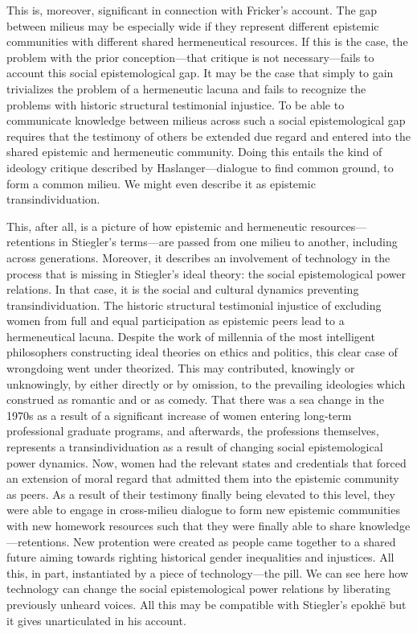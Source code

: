 \documentclass[letterpaper,notitlepage,12pt]{article}
\begin{document}
This is, moreover, significant in connection with Fricker's account.
The gap between milieus may be especially wide if they represent different
epistemic communities with different shared hermeneutical resources.
If this is the case, the problem with the prior conception---that critique is
not necessary---fails to account this social epistemological gap.
It may be the case that simply  to gain
 trivializes the problem of a hermeneutic lacuna and
fails to recognize the problems with historic structural testimonial injustice.
To be able to communicate knowledge between milieus across such a social
epistemological gap requires that the testimony of others be extended due regard
and entered into the shared epistemic and hermeneutic community.
Doing this entails the kind of ideology critique described by
Haslanger---dialogue to find common ground, to form a common milieu.
We might even describe it as epistemic transindividuation.

This, after all, is a picture of how epistemic and hermeneutic
resources---retentions in Stiegler's terms---are passed from one milieu to
another, including across generations.
Moreover, it describes an involvement of technology in the process that is
missing in Stiegler's ideal theory: the social epistemological power relations.
In that case, it is the social and cultural dynamics preventing
transindividuation.
The historic structural testimonial injustice of excluding women from full and
equal participation as epistemic peers lead to a hermeneutical lacuna.
Despite the work of millennia of the most intelligent philosophers constructing
ideal theories on ethics and politics, this clear case of wrongdoing went
under theorized.
This may contributed, knowingly or unknowingly, by either directly or by
omission, to the prevailing ideologies which construed  as romantic and  or  as comedy.
That there was a sea change in the 1970s as a result of a significant increase
of women entering long-term professional graduate programs, and afterwards, the
professions themselves, represents a transindividuation as a result of changing
social epistemological power dynamics.
Now, women had the relevant states and credentials that forced an extension of
moral regard that admitted them into the epistemic community as peers.
As a result of their testimony finally being elevated to this level, they were
able to engage in cross-milieu dialogue to form new epistemic communities with
new homework resources such that they were finally able to share
knowledge---retentions.
New protention were created as people came together to a shared future aiming
towards righting historical gender inequalities and injustices.
All this, in part, instantiated by a piece of technology---the pill.
We can see here how technology can change the social epistemological power
relations by liberating previously unheard voices.
All this may be compatible with Stiegler's epokh\={e} but it gives unarticulated
in his account.
\end{document}
